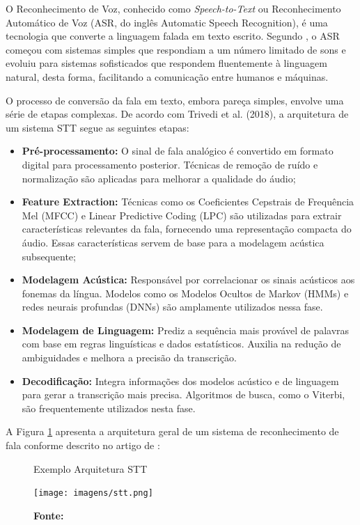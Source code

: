 O Reconhecimento de Voz, conhecido como \textit{Speech-to-Text} ou Reconhecimento Automático de Voz (ASR, do inglês Automatic Speech Recognition), é uma tecnologia que converte a linguagem falada em texto escrito. Segundo , o ASR começou com sistemas simples que respondiam a um número limitado de sons e evoluiu para sistemas sofisticados que respondem fluentemente à linguagem natural, desta forma, facilitando a comunicação entre humanos e máquinas.

O processo de conversão da fala em texto, embora pareça simples,  envolve uma série de etapas complexas. De acordo com Trivedi et al. (2018), a arquitetura de um sistema STT segue as seguintes etapas:

\begin{itemize}
    \item \textbf{Pré-processamento:} O sinal de fala analógico é convertido em formato digital para processamento posterior. Técnicas de remoção de ruído e normalização são aplicadas para melhorar a qualidade do áudio;
    \item \textbf{Feature Extraction:} Técnicas como os Coeficientes Cepstrais de Frequência Mel (MFCC) e Linear Predictive Coding (LPC) são utilizadas para extrair características relevantes da fala, fornecendo uma representação compacta do áudio. Essas características servem de base para a modelagem acústica subsequente;
    \item \textbf{Modelagem Acústica:} Responsável por correlacionar os sinais acústicos aos fonemas da língua. Modelos como os Modelos Ocultos de Markov (HMMs) e redes neurais profundas (DNNs) são amplamente utilizados nessa fase.
    \item \textbf{Modelagem de Linguagem:} Prediz a sequência mais provável de palavras com base em regras linguísticas e dados estatísticos. Auxilia na redução de ambiguidades e melhora a precisão da transcrição.
    \item \textbf{Decodificação:} Integra informações dos modelos acústico e de linguagem para gerar a transcrição mais precisa. Algoritmos de busca, como o Viterbi, são frequentemente utilizados nesta fase.
\end{itemize}

A Figura \ref{fig:4} apresenta a arquitetura geral de um sistema de reconhecimento de fala conforme descrito no artigo de :

\begin{figure}[!h]
     \caption{Exemplo Arquitetura STT}
     \centering
     \texttt{[image: imagens/stt.png]}
     \label{fig:4}
     \caption*{\textbf{Fonte:} }
\end{figure}

